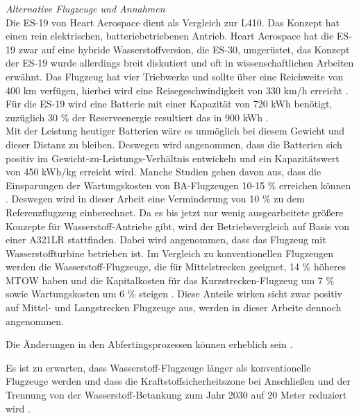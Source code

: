 \textit{Alternative Flugzeuge und Annahmen}\\
Die ES-19 von Heart Aerospace dient als Vergleich zur L410. 
Das Konzept hat einen rein elektrischen, batteriebetriebenen Antrieb.
Heart Aerospace hat die ES-19 zwar auf eine hybride Wasserstoffversion, die ES-30, umgerüstet, 
das Konzept der ES-19 wurde allerdings breit diskutiert und oft in wissenschaftlichen Arbeiten erwähnt. 
Das Flugzeug hat vier Triebwerke und sollte über eine Reichweite von 400 km verfügen, 
hierbei wird eine Reisegeschwindigkeit von 330 km/h erreicht  \cite{anker2023feasibility} \cite{heart_aerospace_es19}.
Für die ES-19 wird eine Batterie mit einer Kapazität von 720 kWh benötigt,
zuzüglich 30 \% der Reserveenergie resultiert das in 900 kWh \cite{donckers2024electric}. \\
Mit der Leistung heutiger Batterien wäre es unmöglich bei diesem Gewicht und dieser Distanz zu bleiben.
Deswegen wird angenommen, dass die Batterien sich positiv im Gewicht-zu-Leistungs-Verhältnis 
entwickeln und ein Kapazitätswert von 450 kWh/kg erreicht wird.
Manche Studien gehen davon aus, dass die Einsparungen der Wartungskosten 
von BA-Flugzeugen 10-15 \% erreichen können \cite{wangsness2021fremskyndet,avogadro2024demystifying}. 
Deswegen wird in dieser Arbeit eine Verminderung von 10 \% zu dem Referenzflugzeug einberechnet.
%
Da es bis jetzt nur wenig ausgearbeitete größere Konzepte für Wasserstoff-Antriebe gibt, 
wird der Betriebsvergleich auf Basis von einer A321LR stattfinden. 
Dabei wird angenommen, dass das Flugzeug mit Wasserstoffturbine betrieben ist.
Im Vergleich zu konventionellen Flugzeugen werden die Wasserstoff-Flugzeuge, 
die für Mittelstrecken geeignet, 14 \% höheres MTOW haben und die Kapitalkosten 
für das Kurzstrecken-Flugzeug um 7 \% sowie Wartungskosten um 6 \% steigen \cite{sky2020hydrogen}. 
Diese Anteile wirken sicht zwar positiv auf Mittel- und Langstrecken Flugzeuge aus, 
werden in dieser Arbeite dennoch angenommen.

Die Änderungen in den Abfertingsprozessen können erheblich sein \cite{ati_hydrogen_infrastructure}. 

Es ist zu erwarten, dass Wasserstoff-Flugzeuge länger als konventionelle Flugzeuge werden
und dass die Kraftstoffsicherheitszone bei Anschließen und der Trennung 
von der Wasserstoff-Betankung zum Jahr 2030 auf 20 Meter reduziert wird \cite{hoelzen2022h2}.

